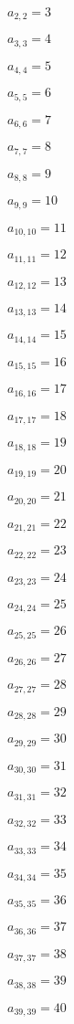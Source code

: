 \documentclass[a4paper,12pt]{article}
\begin{document}
$a _{ 2, 2 } = 3$

$a _{ 3, 3 } = 4$

$a _{ 4, 4 } = 5$

$a _{ 5, 5 } = 6$

$a _{ 6, 6 } = 7$

$a _{ 7, 7 } = 8$

$a _{ 8, 8 } = 9$

$a _{ 9, 9 } = 10$

$a _{ 10, 10 } = 11$

$a _{ 11, 11 } = 12$

$a _{ 12, 12 } = 13$

$a _{ 13, 13 } = 14$

$a _{ 14, 14 } = 15$

$a _{ 15, 15 } = 16$

$a _{ 16, 16 } = 17$

$a _{ 17, 17 } = 18$

$a _{ 18, 18 } = 19$

$a _{ 19, 19 } = 20$

$a _{ 20, 20 } = 21$

$a _{ 21, 21 } = 22$

$a _{ 22, 22 } = 23$

$a _{ 23, 23 } = 24$

$a _{ 24, 24 } = 25$

$a _{ 25, 25 } = 26$

$a _{ 26, 26 } = 27$

$a _{ 27, 27 } = 28$

$a _{ 28, 28 } = 29$

$a _{ 29, 29 } = 30$

$a _{ 30, 30 } = 31$

$a _{ 31, 31 } = 32$

$a _{ 32, 32 } = 33$

$a _{ 33, 33 } = 34$

$a _{ 34, 34 } = 35$

$a _{ 35, 35 } = 36$

$a _{ 36, 36 } = 37$

$a _{ 37, 37 } = 38$

$a _{ 38, 38 } = 39$

$a _{ 39, 39 } = 40$
\end{document}
